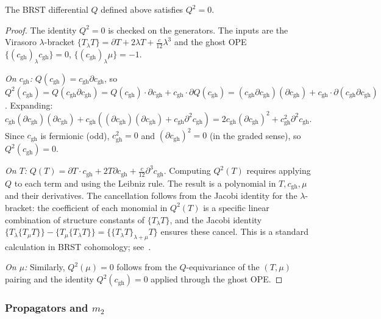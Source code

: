 \begin{lemma}[Nilpotency $Q^2 = 0$]
The BRST differential $Q$ defined above satisfies $Q^2 = 0$.
\end{lemma}
\begin{proof}
The identity $Q^2 = 0$ is checked on the generators. The inputs are the Virasoro $\lambda$-bracket $\{T_\lambda T\} = \partial T + 2\lambda T + \frac{c}{12}\lambda^3$ and the ghost OPE $\{(c_{\mathrm{gh}})_\lambda c_{\mathrm{gh}}\} = 0$, $\{(c_{\mathrm{gh}})_\lambda \mu\} = -1$.

\emph{On $c_{\mathrm{gh}}$:} $Q(c_{\mathrm{gh}}) = c_{\mathrm{gh}}\partial c_{\mathrm{gh}}$, so $Q^2(c_{\mathrm{gh}}) = Q(c_{\mathrm{gh}}\partial c_{\mathrm{gh}}) = Q(c_{\mathrm{gh}})\cdot\partial c_{\mathrm{gh}} + c_{\mathrm{gh}}\cdot\partial Q(c_{\mathrm{gh}}) = (c_{\mathrm{gh}}\partial c_{\mathrm{gh}})(\partial c_{\mathrm{gh}}) + c_{\mathrm{gh}}\cdot\partial(c_{\mathrm{gh}}\partial c_{\mathrm{gh}})$. Expanding: $c_{\mathrm{gh}}(\partial c_{\mathrm{gh}})(\partial c_{\mathrm{gh}}) + c_{\mathrm{gh}}((\partial c_{\mathrm{gh}})(\partial c_{\mathrm{gh}}) + c_{\mathrm{gh}}\partial^2 c_{\mathrm{gh}}) = 2c_{\mathrm{gh}}(\partial c_{\mathrm{gh}})^2 + c_{\mathrm{gh}}^2\partial^2 c_{\mathrm{gh}}$. Since $c_{\mathrm{gh}}$ is fermionic (odd), $c_{\mathrm{gh}}^2 = 0$ and $(\partial c_{\mathrm{gh}})^2 = 0$ (in the graded sense), so $Q^2(c_{\mathrm{gh}}) = 0$.

\emph{On $T$:} $Q(T) = \partial T \cdot c_{\mathrm{gh}} + 2T\partial c_{\mathrm{gh}} + \frac{c}{12}\partial^3 c_{\mathrm{gh}}$. Computing $Q^2(T)$ requires applying $Q$ to each term and using the Leibniz rule. The result is a polynomial in $T, c_{\mathrm{gh}}, \mu$ and their derivatives. The cancellation follows from the Jacobi identity for the $\lambda$-bracket: the coefficient of each monomial in $Q^2(T)$ is a specific linear combination of structure constants of $\{T_\lambda T\}$, and the Jacobi identity $\{T_\lambda \{T_\mu T\}\} - \{T_\mu \{T_\lambda T\}\} = \{\{T_\lambda T\}_{\lambda+\mu} T\}$ ensures these cancel. This is a standard calculation in BRST cohomology; see~\cite{FMS86}.

\emph{On $\mu$:} Similarly, $Q^2(\mu) = 0$ follows from the $Q$-equivariance of the $(T,\mu)$ pairing and the identity $Q^2(c_{\mathrm{gh}}) = 0$ applied through the ghost OPE.
\end{proof}

\subsubsection{Propagators and $m_2$}

